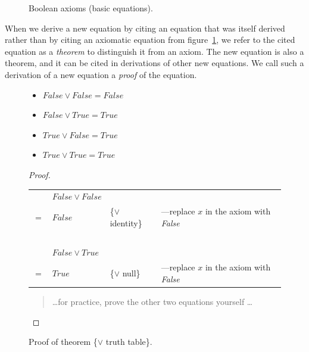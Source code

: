 \begin{figure}
\caption{Boolean axioms (basic equations).}
\label{fig-02-03}
\end{figure}

When we derive a new equation by citing an equation that was
itself derived rather than by citing an axiomatic equation
from figure~\ref{fig-02-03},
we refer to the cited equation as a \emph{theorem} to
distinguish it from an axiom.
The new equation is also a theorem,
and it can be cited in derivations of other new equations.
We call such a derivation of a new equation a
\emph{proof} of the equation.

\begin{figure}
\begin{theorem}
\mbox{}
\begin{itemize}
\item $False \vee False = False$
\item $False \vee True  = True$
\item $True  \vee False = True$
\item $True  \vee True  = True$
\end{itemize}
\end{theorem}

\begin{proof}
\mbox{}\\
\begin{tabular}{llll}
    &$False \vee False$    & \\
$=$ & $False$              & \{$\vee$ identity\}  &---replace $x$ in the axiom with \emph{False}\\
    &  ~                   & \\
    & $False \vee True$    & \\
$=$ & $True$               & \{$\vee$ null\}      &---replace $x$ in the axiom with \emph{False}\\
\end{tabular}
\begin{quote}
\dots for practice, prove the other two equations yourself \dots
\end{quote}
\end{proof}
\caption{Proof of theorem \{$\vee$ truth table\}.}
\label{or-truth-table}
\end{figure}

